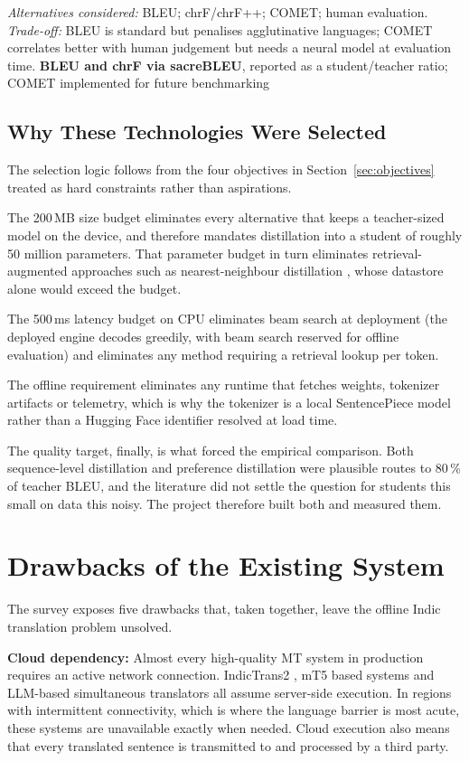 \emph{Alternatives considered:} BLEU; chrF/chrF++; COMET; human evaluation. \emph{Trade-off:} BLEU is standard but penalises agglutinative languages; COMET correlates better with human judgement but needs a neural model at evaluation time. \textbf{BLEU and chrF via sacreBLEU}, reported as a student/teacher ratio; COMET implemented for future benchmarking


\subsection{Why These Technologies Were Selected}
\label{subsec:why}

The selection logic follows from the four objectives in
Section~\ref{sec:objectives} treated as hard constraints rather than
aspirations.

The 200\,MB size budget eliminates every alternative that keeps a teacher-sized
model on the device, and therefore mandates distillation into a student of
roughly 50 million parameters. That parameter budget in turn eliminates
retrieval-augmented approaches such as nearest-neighbour distillation
\cite{ref:knnkd}, whose datastore alone would exceed the budget.

The 500\,ms latency budget on CPU eliminates beam search at deployment (the
deployed engine decodes greedily, with beam search reserved for offline
evaluation) and eliminates any method requiring a retrieval lookup per token.

The offline requirement eliminates any runtime that fetches weights, tokenizer
artifacts or telemetry, which is why the tokenizer is a local SentencePiece
model rather than a Hugging Face identifier resolved at load time.

The quality target, finally, is what forced the empirical comparison. Both
sequence-level distillation and preference distillation were plausible routes to
80\,\% of teacher BLEU, and the literature did not settle the question for
students this small on data this noisy. The project therefore built both and
measured them.

\section{Drawbacks of the Existing System}
\label{sec:drawbacks}

The survey exposes five drawbacks that, taken together, leave the offline Indic
translation problem unsolved.

\textbf{Cloud dependency:} Almost every high-quality MT system in production
requires an active network connection. IndicTrans2 \cite{ref:indictrans2}, mT5
based systems \cite{ref:mt5indic} and LLM-based simultaneous translators
\cite{ref:latency} all assume server-side execution. In regions with intermittent
connectivity, which is where the language barrier is most acute, these
systems are unavailable exactly when needed. Cloud execution also means that
every translated sentence is transmitted to and processed by a third party.

